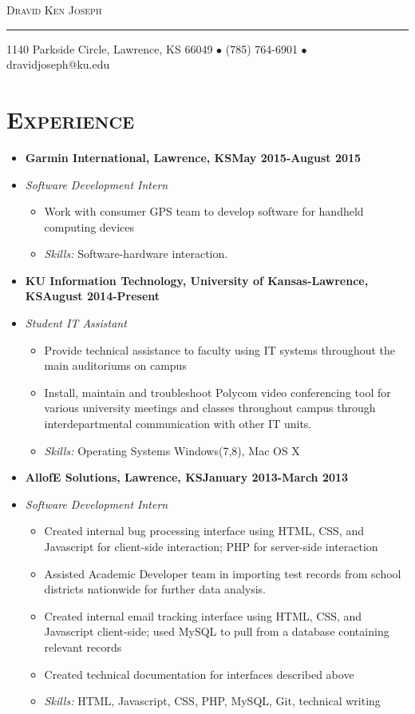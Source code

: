 \documentclass[10pt, oneside]{article}
\makeatletter
\newcommand{\lr}[2]{#1\hfill#2}
\newcommand{\name}{Dravid Ken Joseph}
\newcommand{\addr}{1140 Parkside Circle, Lawrence, KS 66049}
\newcommand{\phone}{(785) 764-6901}
\newcommand{\email}{dravidjoseph@ku.edu}
\newcommand{\resname}[4]{
  \begin{center}
    \selectfont\LARGE\scshape #1
    \normalfont
    \footnotesize
    \itshape
    \rule{\textwidth}{1pt}
    #2 $\bullet$ #3 $\bullet$ #4
    \normalfont
  \end{center}
}
\newcommand{\skills}[1]{
\item[] \textsl{Skills:} #1
}
\newenvironment{ressection}[1]{
  \section{\normalsize \scshape \selectfont #1 \normalfont}
  \vspace{-4pt}
  \begin{itemize} \itemsep-2pt
  }{
  \end{itemize}
  \vspace{-20pt}
}
\newenvironment{resitem}[4]{
\item[] \lr{\bfseries \selectfont #1\normalfont, #2} {#3}
\item[] \textsl{#4}
  \vspace{-4pt}
  \begin{itemize} \itemsep-2pt
  }{
  \end{itemize}
}
\makeatother
\begin{document}
\resname{\name}{\addr}{\phone}{\email}
\setcounter{secnumdepth}{-1} %

\begin{ressection}{Experience}

    \begin{resitem}{Garmin International}{Lawrence, KS}{May 2015-August 2015}{Software Development Intern}
  \item Work with consumer GPS team to develop software for handheld computing devices
   \skills{Software-hardware interaction.}
  \end{resitem}

  \begin{resitem}{KU Information Technology}{University of Kansas-Lawrence, KS}{August 2014-Present}{Student IT Assistant} 
  \item Provide technical assistance to faculty using IT systems throughout the main auditoriums on campus
  \item Install, maintain and troubleshoot Polycom video conferencing tool for various university meetings and classes throughout campus through interdepartmental communication with other IT units.
    \skills{Operating Systems Windows(7,8), Mac OS X}
  \end{resitem}
  

  
  \begin{resitem}{AllofE Solutions}{Lawrence, KS}{January 2013-March 2013}{Software Development Intern}
  \item Created internal bug processing interface using HTML, CSS, and Javascript for client-side interaction; PHP for server-side interaction
  \item Assisted Academic Developer team in importing test records from school districts nationwide for further data analysis.
  \item Created internal email tracking interface using HTML, CSS, and Javascript client-side; used MySQL to pull from a database containing relevant records
  \item Created technical documentation for interfaces described above
   \skills{HTML, Javascript, CSS, PHP, MySQL, Git, technical writing}
  \end{resitem}
  

\end{ressection}
\end{document}
